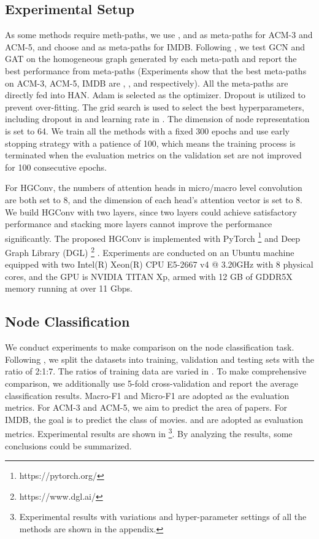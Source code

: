 \subsection{Experimental Setup}
As some methods require meth-paths, we use ,  and  as meta-paths for ACM-3 and ACM-5, and choose  and  as meta-paths for IMDB. Following \citet{DBLP:conf/www/WangJSWYCY19}, we test GCN and GAT on the homogeneous graph generated by each meta-path and report the best performance from meta-paths (Experiments show that the best meta-paths on ACM-3, ACM-5, IMDB are , , and  respectively). All the meta-paths are directly fed into HAN. Adam \cite{kingma2014adam} is selected as the optimizer. Dropout \cite{DBLP:journals/jmlr/SrivastavaHKSS14} is utilized to prevent over-fitting. The grid search is used to select the best hyperparameters, including dropout in  and learning rate in . The dimension of node representation is set to 64. We train all the methods with a fixed 300 epochs and use early stopping strategy with a patience of 100, which means the training process is terminated when the evaluation metrics on the validation set are not improved for 100 consecutive epochs. 

For HGConv, the numbers of attention heads in micro/macro level convolution are both set to 8, and the dimension of each head's attention vector is set to 8. We build HGConv with two layers, since two layers could achieve satisfactory performance and stacking more layers cannot improve the performance significantly. The proposed HGConv is implemented with PyTorch \footnote{https://pytorch.org/} \cite{DBLP:conf/nips/PaszkeGMLBCKLGA19} and Deep Graph Library (DGL) \footnote{https://www.dgl.ai/} \cite{wang2019deep}. Experiments are conducted on an Ubuntu machine equipped with two Intel(R) Xeon(R) CPU E5-2667 v4 @ 3.20GHz with 8 physical cores, and the GPU is NVIDIA TITAN Xp, armed with 12 GB of GDDR5X memory running at over 11 Gbps.

\subsection{Node Classification}
We conduct experiments to make comparison on the node classification task. Following \cite{DBLP:conf/www/WangJSWYCY19}, we split the datasets into training, validation and testing sets with the ratio of 2:1:7. The ratios of training data are varied in . To make comprehensive comparison, we additionally use 5-fold cross-validation and report the average classification results. Macro-F1 and Micro-F1 are adopted as the evaluation metrics. For ACM-3 and ACM-5, we aim to predict the area of papers. For IMDB, the goal is to predict the class of movies.  and  are adopted as evaluation metrics. Experimental results are shown in  \footnote{Experimental results with variations and hyper-parameter settings of all the methods are shown in the appendix.}. By analyzing the results, some conclusions could be summarized.

